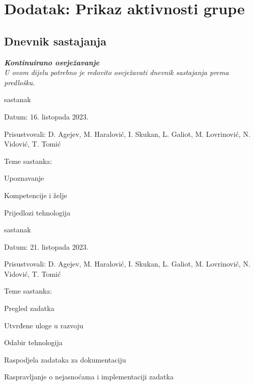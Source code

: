 \chapter*{Dodatak: Prikaz aktivnosti grupe}
	
		\section*{Dnevnik sastajanja}
		
		\textbf{\textit{Kontinuirano osvježavanje}}\\
		
		\textit{U ovom dijelu potrebno je redovito osvježavati dnevnik sastajanja prema predlošku.}
		
		\begin{packed_enum}
			\item  sastanak
			
			\item[] \begin{packed_item}
				\item Datum: 16. listopada 2023.
				\item Prisustvovali: D. Agejev, M. Haralović, I. Skukan, L. Galiot, M. Lovrinović, N. Vidović, T. Tomić
				\item Teme sastanka:
				\begin{packed_item}
					\item  Upoznavanje
					\item  Kompetencije i želje
					\item  Prijedlozi tehnologija
				\end{packed_item}
			\end{packed_item}
			
			\item  sastanak
			\item[] \begin{packed_item}
				\item Datum: 21. listopada 2023.
				\item Prisustvovali:  D. Agejev, M. Haralović, I. Skukan, L. Galiot, M. Lovrinović, N. Vidović, T. Tomić
				\item Teme sastanka:
				\begin{packed_item}
					\item  Pregled zadatka
					\item  Utvrđene uloge u razvoju
					\item  Odabir tehnologija
					\item  Raspodjela zadataka za dokumentaciju
					\item  Raspravljanje o nejasnoćama i implementaciji zadatka
				\end{packed_item}
			\end{packed_item}
			

\end{packed_enum}
